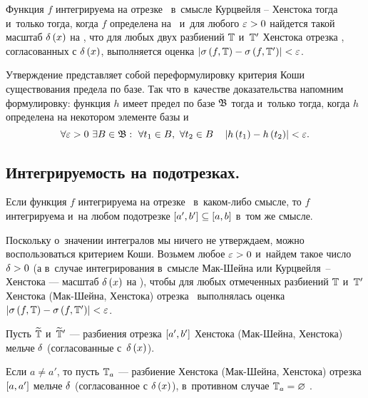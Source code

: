 \documentclass[draft]{article}
\begin{document}
\smallskip

Функция $f$ интегрируема на отрезке \ab\ в~смысле Курцвейля --
Хенстока тогда и~только тогда, когда $f$ определена на \ab\ и~для
любого $\varepsilon > 0$ найдется такой масштаб $\dex$ на \ab, что для любых
двух разбиений $\mathbb{T}$ и~$\mathbb{T}'$ Хенстока отрезка \ab, согласованных с
$\dex$, выполняется оценка $\abs{\isfT-\isfTp}<\ep$.

\smallskip

\pr

Утверждение представляет собой переформулировку критерия Коши
существования предела по базе. Так что в~качестве доказательства
напомним формулировку: функция $h$ имеет предел по базе $\mathfrak{B}$
тогда и~только тогда, когда $h$ определена на некотором элементе
базы и
$$\forall\epgz\ \exists B\in\base:\ \forall t_1\in B,\ \forall t_2\in
B\quad \abs{h\at(t_1)-h\at(t_2)}<\ep.$$

\prut

\bigskip



\subsection{Интегрируемость на подотрезках.}


Если функция $f$ интегрируема на отрезке \ab\ в~каком-либо смысле,
то $f$ интегрируема и~на любом подотрезке
$\seg[a',b']\subseteq\segab$ в~том же смысле.

\pr

Поскольку о~значении интегралов мы ничего не утверждаем, можно
воспользоваться критерием Коши. Возьмем любое $\varepsilon > 0$ и~найдем такое
число $\delta > 0$ (а в~случае интегрирования в~смысле Мак-Шейна или
Курцвейля~-- Хенстока --- масштаб $\dex$ на \ab), чтобы для любых
отмеченных разбиений $\mathbb{T}$ и~$\mathbb{T}'$ Хенстока (Мак-Шейна, Хенстока)
отрезка \ab\ выполнялась оценка $\abs{\isfT-\isfTp}<\ep$.

\smallskip

Пусть $\widetilde{\mathbb{T}}$ и~$\widetilde{\mathbb{T}}'$ --- разбиения отрезка $\seg[a',b']$ Хенстока
(Мак-Шейна, Хенстока) мельче $\delta$ (согласованные с~$\dex$).

\smallskip

Если $a\neq a'$, то пусть $\mathbb{T}_a$ --- разбиение Хенстока (Мак-Шейна,
Хенстока) отрезка $\seg[a,a']$ мельче $\delta$ (согласованное с
$\dex$), в~противном случае $\mathbb{T}_a=\varnothing$ .
\end{document}
